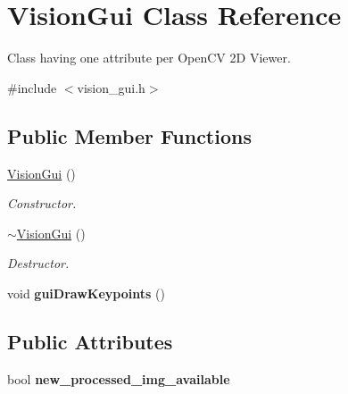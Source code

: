 \hypertarget{classVisionGui}{}\section{Vision\+Gui Class Reference}
\label{classVisionGui}


Class having one attribute per Open\+CV 2D Viewer.  




{\ttfamily \#include $<$vision\+\_\+gui.\+h$>$}

\subsection*{Public Member Functions}
\begin{DoxyCompactItemize}
\item 
\mbox{\label{classVisionGui_a5644adaa95fdc17a31a7f93b56dc9877}} 
\hyperlink{classVisionGui_a5644adaa95fdc17a31a7f93b56dc9877}{Vision\+Gui} ()
\begin{DoxyCompactList}\small\item\em Constructor. \end{DoxyCompactList}\item 
\mbox{\label{classVisionGui_a81c5abb0ecb8f778f7231d203c1e5e34}} 
\hyperlink{classVisionGui_a81c5abb0ecb8f778f7231d203c1e5e34}{$\sim$\+Vision\+Gui} ()
\begin{DoxyCompactList}\small\item\em Destructor. \end{DoxyCompactList}\item 
\mbox{\label{classVisionGui_aa854ee62bbbd30e7e6cfdfdd5289c356}} 
void {\bfseries gui\+Draw\+Keypoints} ()
\end{DoxyCompactItemize}
\subsection*{Public Attributes}
\begin{DoxyCompactItemize}
\item 
\mbox{\label{classVisionGui_aa6529d6831271a627be6aabce599b387}} 
bool {\bfseries new\+\_\+processed\+\_\+img\+\_\+available}
\end{DoxyCompactItemize}
